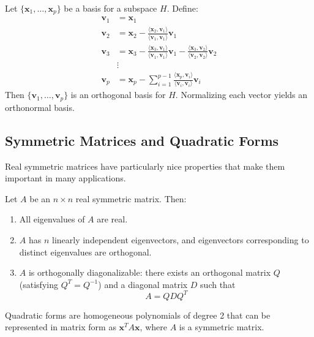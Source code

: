 \begin{theorem}
Let $\{\mathbf{x}_1, \ldots, \mathbf{x}_p\}$ be a basis for a subspace $H$. Define:
\begin{align*}
\mathbf{v}_1 &= \mathbf{x}_1 \\
\mathbf{v}_2 &= \mathbf{x}_2 - \frac{\langle \mathbf{x}_2, \mathbf{v}_1 \rangle}{\langle \mathbf{v}_1, \mathbf{v}_1 \rangle} \mathbf{v}_1 \\
\mathbf{v}_3 &= \mathbf{x}_3 - \frac{\langle \mathbf{x}_3, \mathbf{v}_1 \rangle}{\langle \mathbf{v}_1, \mathbf{v}_1 \rangle} \mathbf{v}_1 - \frac{\langle \mathbf{x}_3, \mathbf{v}_2 \rangle}{\langle \mathbf{v}_2, \mathbf{v}_2 \rangle} \mathbf{v}_2 \\
&\vdots \\
\mathbf{v}_p &= \mathbf{x}_p - \sum_{i=1}^{p-1} \frac{\langle \mathbf{x}_p, \mathbf{v}_i \rangle}{\langle \mathbf{v}_i, \mathbf{v}_i \rangle} \mathbf{v}_i
\end{align*}
Then $\{\mathbf{v}_1, \ldots, \mathbf{v}_p\}$ is an orthogonal basis for $H$. Normalizing each vector yields an orthonormal basis.
\end{theorem}

\subsection{Symmetric Matrices and Quadratic Forms}

Real symmetric matrices have particularly nice properties that make them important in many applications.

\begin{theorem}
Let $A$ be an $n \times n$ real symmetric matrix. Then:
\begin{enumerate}
    \item All eigenvalues of $A$ are real.
    \item $A$ has $n$ linearly independent eigenvectors, and eigenvectors corresponding to distinct eigenvalues are orthogonal.
    \item $A$ is orthogonally diagonalizable: there exists an orthogonal matrix $Q$ (satisfying $Q^T = Q^{-1}$) and a diagonal matrix $D$ such that
    \[
    A = QDQ^T
    \]
\end{enumerate}
\end{theorem}

Quadratic forms are homogeneous polynomials of degree 2 that can be represented in matrix form as $\mathbf{x}^T A \mathbf{x}$, where $A$ is a symmetric matrix.

